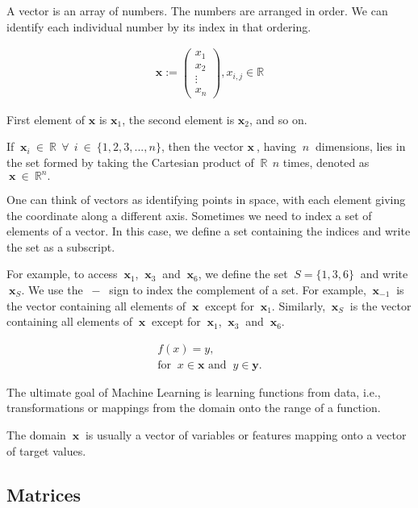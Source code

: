 \documentclass[12pt]{article}
\begin{document}
A vector is an array of numbers. The numbers are arranged in order. We can identify each individual number by its index in that ordering.

\begin{align}
\mathbf{x} := \begin{pmatrix} x_{1} \\ x_{2} \\ \vdots \\ x_{n} \end{pmatrix}, x_{i,j} \in \mathbb{R}
\end{align}

First element of $\mathbf{x}$ is $\mathbf{x}_{1}$, the second element is $\mathbf{x}_{2}$, and so on.

If $\ \mathbf{x}_{i} \ \in \ \mathbb{R} \ \ \forall \ \ i \ \in \ \{1,2,3,...,n\}$, then the vector $\mathbf{x} \ $, having $\ n \ $ dimensions, lies in the set formed by taking the Cartesian product of $\ \mathbb{R} \ \ n$ times, denoted as $\ \mathbf{x} \ \in \ \mathbb{R}^{n}.$

One can think of vectors as identifying points in space, with each element giving the coordinate along a different axis. Sometimes we need to index a set of elements of a vector. In this case, we define a set containing the indices and write the set as a subscript.

For example, to access $\ \mathbf{x}_1$, $\ \mathbf{x}_3\ $ and $\ \mathbf{x}_6$, we define the set $\ S = \{1,3,6\}\ $ and write $\ \mathbf{x}_S.$ We use the $\ -\ $ sign to index the complement of a set. For example, $\ \mathbf{x}_{-1}\ $ is the vector containing all elements of $\ \mathbf{x}\ $ except for $\ \mathbf{x}_1.$ Similarly, $\ \mathbf{x}_S\ $ is the vector containing all elements of  $\ \mathbf{x}\ $ except for $\ \mathbf{x}_1$, $\ \mathbf{x}_3\ $ and $\ \mathbf{x}_6.$

\begin{align}
f(x) = y, \\
\text{for $\ x \in \mathbf{x}$ and $\ y \in \mathbf{y}$.}
\end{align}

The ultimate goal of Machine Learning is learning functions from data, i.e., transformations or mappings from the domain onto the range of a function.

The domain $\ \mathbf{x} \ $ is usually a vector of variables or features mapping onto a vector of target values.

\subsection{Matrices}
\end{document}
